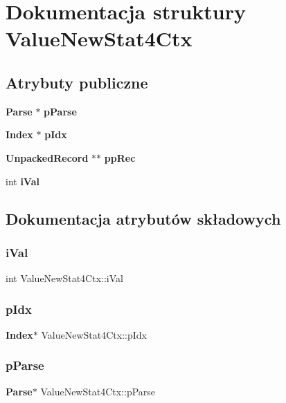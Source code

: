 \section{Dokumentacja struktury Value\+New\+Stat4\+Ctx}
\label{struct_value_new_stat4_ctx}
\subsection*{Atrybuty publiczne}
\begin{DoxyCompactItemize}
\item 
\textbf{ Parse} $\ast$ \textbf{ p\+Parse}
\item 
\textbf{ Index} $\ast$ \textbf{ p\+Idx}
\item 
\textbf{ Unpacked\+Record} $\ast$$\ast$ \textbf{ pp\+Rec}
\item 
int \textbf{ i\+Val}
\end{DoxyCompactItemize}


\subsection{Dokumentacja atrybutów składowych}
\mbox{\label{struct_value_new_stat4_ctx_a54d56872d3653e59a00a91ea1c6b7664}} 
\subsubsection{iVal}
{\footnotesize\ttfamily int Value\+New\+Stat4\+Ctx\+::i\+Val}

\mbox{\label{struct_value_new_stat4_ctx_a31a0ab3baf8fab451df095591408acad}} 
\subsubsection{pIdx}
{\footnotesize\ttfamily \textbf{ Index}$\ast$ Value\+New\+Stat4\+Ctx\+::p\+Idx}

\mbox{\label{struct_value_new_stat4_ctx_aa1d5c751a45f4e608dbd883179dd2f18}} 
\subsubsection{pParse}
{\footnotesize\ttfamily \textbf{ Parse}$\ast$ Value\+New\+Stat4\+Ctx\+::p\+Parse}

